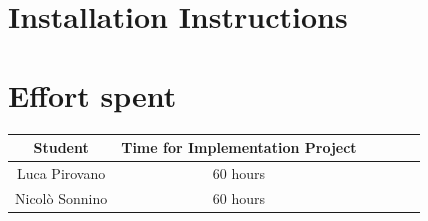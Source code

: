 \documentclass[table, 12pt]{article}
\begin{document}
\newpage
\section{Installation Instructions}

\section{Effort spent}
\begin{center}
    \begin{tabular}{ | c || c | c | c | c| c|}
        \hline
        Student        & Time for Implementation Project \\ \hline
        Luca Pirovano  & 60 hours                        \\ \hline
        Nicolò Sonnino & 60 hours                        \\
        \hline
    \end{tabular}
\end{center}
\end{document}

